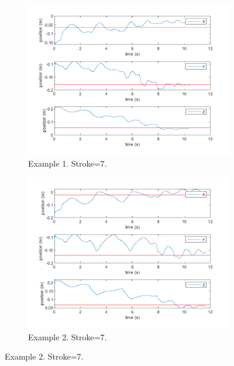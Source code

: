 \begin{figure}[ht]
    \vspace{2pt} %

        \begin{subfigure}[b]{0.45\textwidth}
        \centering
        \includegraphics[width=\linewidth]{Pictures/Results/Controller/Stroke7/6.png}
        \caption{Example 1. Stroke=7.}
    \end{subfigure}%
    \hfill
    \begin{subfigure}[b]{0.45\textwidth}
        \centering
        \includegraphics[width=\linewidth]{Pictures/Results/Controller/Stroke7/20.png}
        \caption{Example 2. Stroke=7.}
    \end{subfigure}
    

\end{figure}

